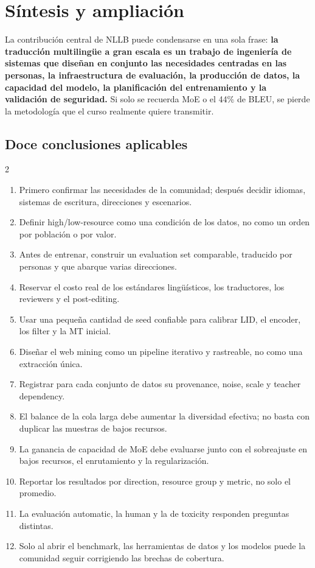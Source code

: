 \section{Síntesis y ampliación}

La contribución central de NLLB puede condensarse en una sola frase: \textbf{la traducción multilingüe a gran escala es un trabajo de ingeniería de sistemas que diseñan en conjunto las necesidades centradas en las personas, la infraestructura de evaluación, la producción de datos, la capacidad del modelo, la planificación del entrenamiento y la validación de seguridad.} Si solo se recuerda MoE o el 44\% de BLEU, se pierde la metodología que el curso realmente quiere transmitir.

\subsection{Doce conclusiones aplicables}

\begingroup
\footnotesize
\setlength{\columnsep}{1.2em}
\begin{multicols}{2}
\begin{enumerate}[itemsep=0.08em,topsep=0.15em,parsep=0pt,leftmargin=*]
  \item Primero confirmar las necesidades de la comunidad; después decidir idiomas, sistemas de escritura, direcciones y escenarios.
  \item Definir high/low-resource como una condición de los datos, no como un orden por población o por valor.
  \item Antes de entrenar, construir un evaluation set comparable, traducido por personas y que abarque varias direcciones.
  \item Reservar el costo real de los estándares lingüísticos, los traductores, los reviewers y el post-editing.
  \item Usar una pequeña cantidad de seed confiable para calibrar LID, el encoder, los filter y la MT inicial.
  \item Diseñar el web mining como un pipeline iterativo y rastreable, no como una extracción única.
  \item Registrar para cada conjunto de datos su provenance, noise, scale y teacher dependency.
  \item El balance de la cola larga debe aumentar la diversidad efectiva; no basta con duplicar las muestras de bajos recursos.
  \item La ganancia de capacidad de MoE debe evaluarse junto con el sobreajuste en bajos recursos, el enrutamiento y la regularización.
  \item Reportar los resultados por direction, resource group y metric, no solo el promedio.
  \item La evaluación automatic, la human y la de toxicity responden preguntas distintas.
  \item Solo al abrir el benchmark, las herramientas de datos y los modelos puede la comunidad seguir corrigiendo las brechas de cobertura.
\end{enumerate}
\end{multicols}
\endgroup


